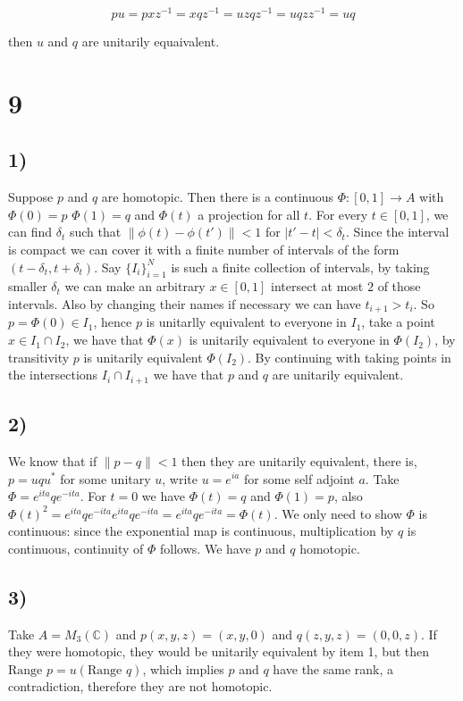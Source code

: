 \documentclass{article}
\begin{document}
\[pu=pxz^{-1}=xqz^{-1}=uzqz^{-1}=uqzz^{-1}=uq\]

then $u$ and $q$ are unitarily equaivalent. 




\section*{9}
\subsection*{1)}
Suppose $p$ and $q$ are homotopic. Then there is a continuous $\Phi:[0,1]\to A$ with $\Phi(0)=p$
$\Phi(1)=q$ and $\Phi(t)$ a projection for all $t$. For every $t\in [0,1]$, we can find $\delta_t$
such that $\|\phi(t)-\phi(t')\|<1$ for $|t'-t|<\delta_t$. Since the interval is compact
we can cover it with a finite number of intervals of the form $(t-\delta_t,t+\delta_t)$. 
Say $\{I_i\}_{i=1}^{N}$ is such a finite collection of intervals, by taking smaller $\delta_t$
we can make an arbitrary $x\in [0,1]$ intersect at most $2$ of those intervals. Also by
changing their names if necessary we can have $t_{i+1}>t_i$. So $p=\Phi(0)\in I_1$, hence
$p$ is unitarlly equivalent to everyone in $I_1$, take a point $x\in I_1\cap I_2$, we have 
that $\Phi(x)$ is unitarily equivalent to everyone in $\Phi(I_2)$, by transitivity $p$ is 
unitarily equivalent $\Phi(I_2)$. By continuing with taking points in the intersections 
$I_i\cap I_{i+1}$ we have that $p$ and $q$ are unitarily equivalent.  

\subsection*{2)}

We know that if $\|p-q\|<1$ then they are unitarily equivalent, there is, $p=uqu^\ast$ for 
some unitary $u$, write $u=e^{ia}$ for some self adjoint $a$. Take $\Phi=e^{ita}qe^{-ita}$.
For $t=0$ we have $\Phi(t)=q$ and $\Phi(1)=p$, also $\Phi(t)^2=e^{ita}qe^{-ita}e^{ita}qe^{-ita}=
e^{ita}qe^{-ita}=\Phi(t)$. We only need to show $\Phi$ is continuous: since the exponential
map is continuous, multiplication by $q$ is continuous, continuity of $\Phi$ follows. 
We have $p$ and $q$ homotopic.


\subsection*{3)}

Take $A=M_3(\mathbb{C})$ and $p(x,y,z)=(x,y,0)$ and $q(z,y,z)=(0,0,z)$.
If they were homotopic, they would be unitarily equivalent by item 1, but
then $\text{Range } p=u (\text{Range } q)$, which implies $p$ and $q$ have the 
same rank, a contradiction, therefore they are not homotopic.
\end{document}
